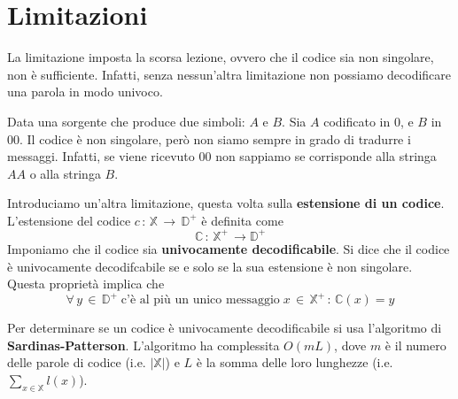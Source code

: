 \documentclass[12pt]{report}
\begin{document}
    \section{Limitazioni}

    La limitazione imposta la scorsa lezione, ovvero che il codice sia non singolare, non è sufficiente. Infatti, senza nessun'altra limitazione non possiamo decodificare una parola in modo univoco.  \\

    \begin{exmp}
        Data una sorgente che produce due simboli: $A$ e $B$.
        Sia $A$ codificato in $0$, e $B$ in $00$. Il codice è non singolare, però non siamo sempre in grado di tradurre i messaggi. Infatti, se viene ricevuto $00$ non sappiamo se corrisponde alla stringa $AA$ o alla stringa $B$.
    \end{exmp}


    \noindent Introduciamo un'altra limitazione, questa volta sulla \textbf{estensione di un codice}.  L'estensione del codice $c\,:\, \mathbb{X}\,\rightarrow \, \mathbb{D}^+$ è definita come $$\mathbb{C}\, : \, \mathbb{X}^+ \, \rightarrow \mathbb{D}^+$$
    Imponiamo che il codice sia \textbf{univocamente decodificabile}. Si dice che il codice è univocamente decodifcabile se e solo se la sua estensione è non singolare. Questa proprietà implica che
    $$\forall \, y \, \in \, \mathbb{D}^+ \; \text{c'è al più un  unico messaggio} \;
    x\,\in \,\mathbb{X}^+ \,: \, \mathbb{C}(x) = y$$

    \noindent Per determinare se un codice è univocamente decodificabile si usa l'algoritmo di \textbf{Sardinas-Patterson}. L'algoritmo ha complessita $O(mL)$, dove $m$ è il numero delle parole di codice (i.e. $|\mathbb{X}|$) e $L$ è la somma delle loro lunghezze (i.e. $\sum_{x\in\mathbb{X}} l(x)$). \\

    \begin{center}
        \def\firstcircle{(0,0) circle (1.5cm)}
        \def\secondcircle{(5:1cm) circle (3cm)}
    \end{center}
    \vspace{10px}
\end{document}
